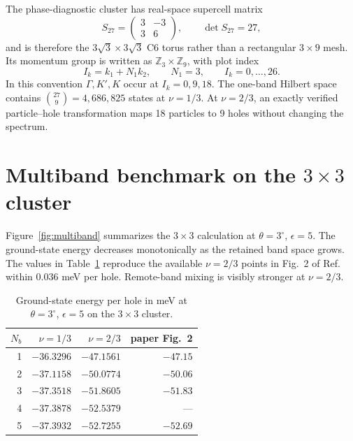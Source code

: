 \documentclass[10pt,twocolumn]{article}
\begin{document}
The phase-diagnostic cluster has real-space supercell matrix
\begin{equation}
S_{27}=\begin{pmatrix}3&-3\\3&6\end{pmatrix},\qquad \det S_{27}=27,
\end{equation}
and is therefore the $3\sqrt3\times3\sqrt3$ C6 torus rather than a rectangular $3\times9$ mesh.  Its momentum group is written as $\mathbb Z_3\times\mathbb Z_9$, with plot index
\begin{equation}
I_k=k_1+N_1k_2,\qquad N_1=3,\qquad I_k=0,\ldots,26.
\end{equation}
In this convention $\Gamma,K',K$ occur at $I_k=0,9,18$.  The one-band Hilbert space contains $\binom{27}{9}=4{,}686{,}825$ states at $\nu=1/3$.  At $\nu=2/3$, an exactly verified particle--hole transformation maps 18 particles to 9 holes without changing the spectrum.

\section{Multiband benchmark on the $3\times3$ cluster}

Figure~\ref{fig:multiband} summarizes the $3\times3$ calculation at $\theta=3^\circ$, $\epsilon=5$.  The ground-state energy decreases monotonically as the retained band space grows.  The values in Table~\ref{tab:energies} reproduce the available $\nu=2/3$ points in Fig.~2 of Ref.~\cite{luo} within $0.036$ meV per hole.  Remote-band mixing is visibly stronger at $\nu=2/3$.

\begin{table}[H]
\centering
\caption{Ground-state energy per hole in meV at $\theta=3^\circ$, $\epsilon=5$ on the $3\times3$ cluster.}
\label{tab:energies}
\begin{tabular}{rrrr}
\toprule
$N_b$ & $\nu=1/3$ & $\nu=2/3$ & paper Fig.~2\\
\midrule
1 & $-36.3296$ & $-47.1561$ & $-47.15$\\
2 & $-37.1158$ & $-50.0774$ & $-50.06$\\
3 & $-37.3518$ & $-51.8605$ & $-51.83$\\
4 & $-37.3878$ & $-52.5379$ & ---\\
5 & $-37.3932$ & $-52.7255$ & $-52.69$\\
\bottomrule
\end{tabular}
\end{table}
\end{document}
